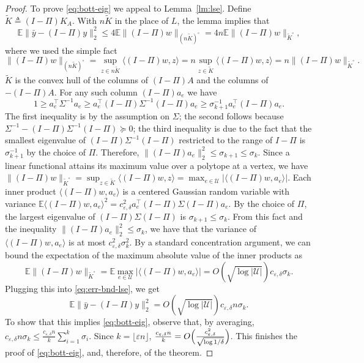 \documentclass{article}
\newcommand{\eps}{\varepsilon}
\newcommand{\E}{\mathbb{E}}
\newcommand{\univ}{U}
\newcommand{\tra}{\intercal}
\renewcommand{\univ}{\mathcal{U}}
\newcommand{\row}{e}
\begin{document}
\begin{proof}
  To prove \eqref{eq:bott-eig} we appeal to Lemma~\ref{lm:lse}. Define
  $\tilde{K} \triangleq (I-\Pi)K_A$. With $n\tilde{K}$ in the place of
  $L$, the lemma implies that
  \begin{equation}\label{eq:err-bnd-lse}
  \E \|\bar{y} - (I-\Pi)y\|_2^2 \leq 4\E\|(I-\Pi)w\|_{(n\tilde{K})^\circ}
  = 4n\E\|(I-\Pi)w\|_{\tilde{K}^\circ},
  \end{equation}
  where we used the simple fact
  \[
  \|(I-\Pi)w\|_{(n\tilde{K})^\circ} = \sup_{z \in n\tilde{K}}{\langle
    (I-\Pi)w, z \rangle} = n\sup_{z \in \tilde{K}}{\langle (I-\Pi)w, z
    \rangle} = n\|(I-\Pi)w\|_{\tilde{K}^\circ}.\]
  $\tilde{K}$ is the convex hull of the columns of $(I-\Pi)A$ and the
  columns of $-(I-\Pi)A$. For any such column $(I-\Pi)a_e$ we have
  \[
    1 \geq a_e^\tra \Sigma^{-1} a_e \geq a_e^\tra(I-\Pi)\Sigma^{-1}(I-\Pi) a_e \geq
    \sigma_{k+1}^{-1}a_e^\tra(I - \Pi)a_e.
  \]
  The first inequality is by the assumption on $\Sigma$; the second
  follows because $\Sigma^{-1} - (I-\Pi)\Sigma^{-1}(I-\Pi) \succeq 0$;
  the third inequality is due to the fact that the smallest eigenvalue
  of $(I-\Pi)\Sigma^{-1}(I-\Pi)$ restricted to the range of $I-\Pi$ is
  $\sigma_{k+1}^{-1}$ by the choice of $\Pi$. Therefore,
  $\|(I-\Pi)a_e\|_2^2 \leq \sigma_{k+1}\leq \sigma_k$. Since a linear
  functional attains its maximum value over a polytope at a vertex, we
  have $\|(I-\Pi)w\|_{\tilde{K}^\circ} = \sup_{z \in
    \tilde{K}}{\langle (I-\Pi)w,z\rangle} = \max_{e\in \univ}{|\langle
    (I-\Pi)w, a_e\rangle}|$. Each inner product $\langle (I-\Pi)w,
  a_e\rangle$ is a centered Gaussian random variable with variance $
  \E\langle (I-\Pi)w, a_\row\rangle^2 = c_{\eps, \delta}^2a_\row^\tra
  (I-\Pi)\Sigma(I-\Pi)a_\row.  $ By the choice of $\Pi$, the largest
  eigenvalue of $(I-\Pi)\Sigma(I-\Pi)$ is $\sigma_{k+1} \leq
  \sigma_k$. From this fact and the inequality $\|(I-\Pi)a_e\|_2^2
  \leq \sigma_k$, we have that the variance of $\langle (I-\Pi)w,
  a_\row\rangle$ is at most $c_{\eps, \delta}^2\sigma_k^2$. By a
  standard concentration argument, we can bound the expectation of the
  maximum absolute value of the inner products as
  \[
  \E\|(I-\Pi)w\|_{\tilde{K}^\circ} =\E \max_{\row \in \univ}{|\langle
    (I-\Pi)w, a_\row\rangle|} = O(\sqrt{\log |\univ|})c_{\eps, \delta}\sigma_k.
  \]
  Plugging this into \eqref{eq:err-bnd-lse}, we get
  \[
  \E \|\bar{y} - (I-\Pi)y\|_2^2 =  O(\sqrt{\log |\univ|})c_{\eps, \delta}n\sigma_k.
  \]
  To show that this implies \eqref{eq:bott-eig}, observe that, by
  averaging, $c_{\eps, \delta}n\sigma_k \leq \frac{c_{\eps,
      \delta}n}{k} \sum_{i=1}^k{\sigma_i}$.  Since $k = \lfloor \eps n
  \rfloor$, $\frac{c_{\eps, \delta}n}{k} = O\Bigl(\frac{c_{\eps,
      \delta}^2}{\sqrt{\log 1/\delta}}\Bigr)$. This finishes the
  proof of \eqref{eq:bott-eig}, and, therefore, of the theorem.
\end{proof}
\end{document}

